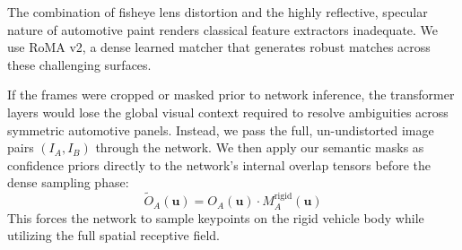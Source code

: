 \documentclass[letterpaper, 10 pt, conference]{ieeeconf}  %
\begin{document}
















The combination of fisheye lens distortion and the highly reflective, specular nature of automotive paint renders classical feature extractors inadequate. We use RoMA v2, a dense learned matcher that generates robust matches across these challenging surfaces.

If the frames were cropped or masked prior to network inference, the transformer layers would lose the global visual context required to resolve ambiguities across symmetric automotive panels. Instead, we pass the full, un-undistorted image pairs $(I_A, I_B)$ through the network. We then apply our semantic masks as confidence priors directly to the network's internal overlap tensors before the dense sampling phase:
\begin{equation}
    \tilde{O}_A(\mathbf{u}) = O_A(\mathbf{u}) \cdot M^{\text{rigid}}_A(\mathbf{u})
\end{equation}
This forces the network to sample keypoints on the rigid vehicle body while utilizing the full spatial receptive field.
\end{document}
